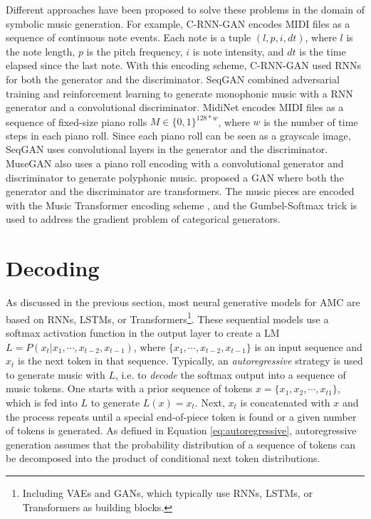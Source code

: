 Different approaches have been proposed to solve these problems in the domain of symbolic music generation. For example, C-RNN-GAN \cite{mogren2016c} encodes MIDI files as a sequence of continuous note events. Each note is a tuple $(l, p, i, dt)$, where $l$ is the note length, $p$ is the pitch frequency, $i$ is note intensity, and $dt$ is the time elapsed since the last note. With this encoding scheme, C-RNN-GAN used RNNs for both the generator and the discriminator. SeqGAN \cite{yu2017seqgan} combined adversarial training and reinforcement learning to generate monophonic music with a RNN generator and a convolutional discriminator. MidiNet \cite{yang2017midinet} encodes MIDI files as a sequence of fixed-size piano rolls $M \in \{0, 1\}^{128*w}$, where $w$ is the number of time steps in each piano roll. Since each piano roll can be seen as a grayscale image, SeqGAN uses convolutional layers in the generator and the discriminator. MuseGAN \cite{dong2018musegan} also uses a piano roll encoding with a convolutional generator and discriminator to generate polyphonic music. \citet{muhamed2021symbolic} proposed a GAN where both the generator and the discriminator are transformers. The music pieces are encoded with the Music Transformer encoding scheme \cite{huang2018music}, and the Gumbel-Softmax trick \cite{jang2016categorical} is used to address the gradient problem of categorical generators.

\section{Decoding}

As discussed in the previous section, most neural generative models for AMC are based on RNNs, LSTMs, or Transformers\footnote{Including VAEs and GANs, which typically use RNNs, LSTMs, or Transformers as building blocks.}. These sequential models use a softmax activation function in the output layer to create a LM $L = P(x_t|x_1, \cdots, x_{t-2}, x_{t-1})$, where $\{x_1, \cdots, x_{t-2}, x_{t-1}\}$ is an input sequence and $x_t$ is the next token in that sequence. Typically, an \textit{autoregressive} strategy is used to generate music with $L$, i.e. to \textit{decode} the softmax output into a sequence of music tokens. One starts with a prior sequence of tokens $x = \{x_1, x_2, \cdots, x_{t 1}\}$, which is fed into $L$ to generate $L(x) = x_{t}$. Next, $x_{t}$ is concatenated with $x$ and the process repeats until a special end-of-piece token is found or a given number of tokens is generated. As defined in Equation \ref{eq:autoregressive}, autoregressive generation assumes that the probability distribution of a sequence of tokens can be decomposed into the product of conditional next token distributions.

